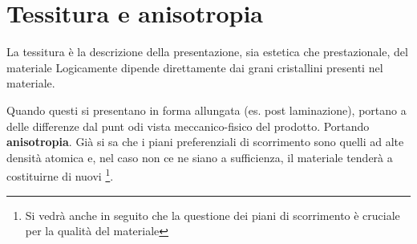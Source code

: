 \section{Tessitura e anisotropia}
La tessitura è la descrizione della presentazione, sia estetica che prestazionale, del materiale
Logicamente dipende direttamente dai grani cristallini presenti nel materiale.

Quando questi si presentano in forma allungata (es. post laminazione), portano 
a delle differenze dal punt odi vista meccanico-fisico del prodotto. 
Portando \textbf{anisotropia}.
Già si sa che i piani preferenziali di scorrimento sono quelli ad alte densità atomica
e, nel caso non ce ne siano a sufficienza, il materiale tenderà a costituirne di nuovi%
\footnote{Si vedrà anche in seguito che la questione dei piani di scorrimento è cruciale per la qualità del materiale}.

